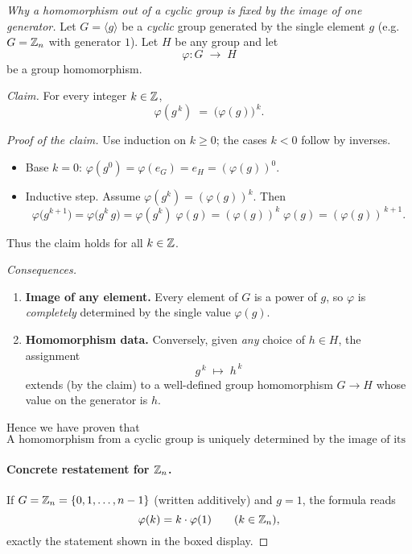 \documentclass[12pt]{article}
\theoremstyle{definition} %
\theoremstyle{plain} %
\begin{document}
  \begin{proof}[Why a homomorphism out of a cyclic group is fixed by the image of one generator]

    Let $G=\langle g\rangle$ be a \emph{cyclic} group generated by the single element $g$
    (e.g.\ $G=\Bbb Z_{n}$ with generator $1$).
    Let $H$ be any group and let
    \[
            \varphi : G \;\longrightarrow\; H
    \]
    be a group homomorphism.
    
    \medskip
    \textit{Claim.}  For every integer $k\in\Bbb Z$,
    \[
            \boxed{\;
            \varphi(g^{\,k}) \;=\; \bigl(\varphi(g)\bigr)^{\,k}.
            \;}
    \]
    
    \smallskip\noindent
    \emph{Proof of the claim.}  
    Use induction on $k\ge 0$; the cases $k<0$ follow by inverses.
    
    \begin{itemize}
        \item Base $k=0$:
              $\varphi(g^{0})=\varphi(e_{G})=e_{H}
              =(\varphi(g))^{0}$.
    
        \item Inductive step.  
              Assume $\varphi(g^{k})=(\varphi(g))^{k}$.
              Then
              \[
                  \varphi\bigl(g^{k+1}\bigr)
                  = \varphi\bigl(g^{k}\,g\bigr)
                  = \varphi(g^{k})\;\varphi(g)
                  = (\varphi(g))^{k}\;\varphi(g)
                  = (\varphi(g))^{\,k+1}.
              \]
    \end{itemize}
    Thus the claim holds for all $k\in\Bbb Z$.
    
    \medskip
    \textit{Consequences.}
    
    \begin{enumerate}
        \item \textbf{Image of any element.}\;
              Every element of $G$ is a power of $g$,
              so $\varphi$ is \emph{completely} determined by the single value
              $\varphi(g)$.
    
        \item \textbf{Homomorphism data.}\;
              Conversely, given \emph{any} choice of $h\in H$,
              the assignment
              \[
                     g^{\,k}\;\longmapsto\;h^{\,k}
              \]
              extends (by the claim) to a well-defined group homomorphism
              $G\to H$ whose value on the generator is $h$.
    \end{enumerate}
    
    \noindent
    Hence we have proven that  
    \[
       \boxed{\text{A homomorphism from a cyclic group is uniquely determined by the image of its generator.}}
    \]
    
    \paragraph{Concrete restatement for $\Bbb Z_{n}$.}
    If $G=\Bbb Z_{n}=\{0,1,\dots ,n-1\}$ (written additively) and $g=1$,
    the formula reads
    \[
            \varphi(k)=k\cdot\varphi(1)\qquad(k\in\Bbb Z_{n}),
    \]
    exactly the statement shown in the boxed display.
    \end{proof}
\end{document}
